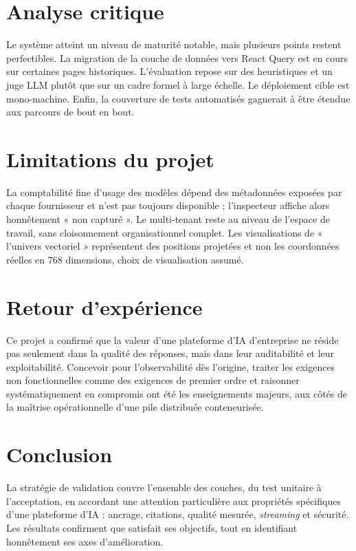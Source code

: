 \section{Analyse critique}
Le système atteint un niveau de maturité notable, mais plusieurs points restent
perfectibles. La migration de la couche de données vers React Query est en cours
sur certaines pages historiques. L'évaluation repose sur des heuristiques et un
juge LLM plutôt que sur un cadre formel à large échelle. Le déploiement cible est
mono-machine. Enfin, la couverture de tests automatisés gagnerait à être étendue
aux parcours de bout en bout.

\section{Limitations du projet}
La comptabilité fine d'usage des modèles dépend des métadonnées exposées par
chaque fournisseur et n'est pas toujours disponible ; l'inspecteur affiche alors
honnêtement « non capturé ». Le multi-tenant reste au niveau de l'espace de
travail, sans cloisonnement organisationnel complet. Les visualisations de
« l'univers vectoriel » représentent des positions projetées et non les
coordonnées réelles en 768 dimensions, choix de visualisation assumé.

\section{Retour d'expérience}
Ce projet a confirmé que la valeur d'une plateforme d'IA d'entreprise ne réside
pas seulement dans la qualité des réponses, mais dans leur auditabilité et leur
exploitabilité. Concevoir pour l'observabilité dès l'origine, traiter les
exigences non fonctionnelles comme des exigences de premier ordre et raisonner
systématiquement en compromis ont été les enseignements majeurs, aux côtés de la
maîtrise opérationnelle d'une pile distribuée conteneurisée.

\section{Conclusion}
La stratégie de validation couvre l'ensemble des couches, du test unitaire à
l'acceptation, en accordant une attention particulière aux propriétés spécifiques
d'une plateforme d'IA : ancrage, citations, qualité mesurée, \emph{streaming} et
sécurité. Les résultats confirment que \devpilot{} satisfait ses objectifs, tout
en identifiant honnêtement ses axes d'amélioration.
